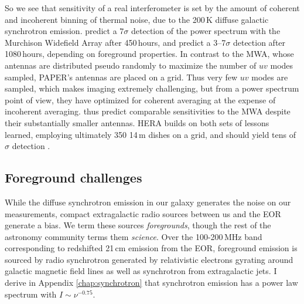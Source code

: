 {So we see that sensitivity of a real interferometer is set by the amount of coherent and incoherent binning of thermal noise, due to the 200\,K diffuse galactic synchrotron emission.  \citet{beardsley13} predict a $7\sigma$ detection of the power spectrum with the Murchison Widefield Array after 450\,hours, and \citet{PoberNextGen} predict a 3--7$\sigma$ detection after 1080\,hours, depending on foreground properties. In contrast to the MWA, whose antennas are distributed pseudo randomly to maximize the number of $uv$ modes sampled, PAPER's antennas are placed on a grid. Thus very few $uv$ modes are sampled, which makes imaging extremely challenging, but from a power spectrum point of view, they have optimized for coherent averaging at the expense of incoherent averaging. \citet{PoberNextGen} thus predict comparable sensitivities to the MWA despite their substantially smaller antennas. HERA builds on both sets of lessons learned, employing ultimately 350 14\,m dishes on a grid, and should yield tens of $\sigma$ detection \citep{neben16b,ewallwice16,nithya16,PoberNextGen,patra16}. 

\subsection{Foreground challenges}
\label{sec:foregroundchallenges}
While the diffuse synchrotron emission in our galaxy generates the noise on our measurements, compact extragalactic radio sources between us and the EOR generate a bias. We term  these sources \textit{foregrounds}, though the rest of the astronomy community terms them \textit{science}. Over the 100-200\,MHz band corresponding to redshifted 21\,cm emission from the EOR, foreground emission is sourced by radio synchrotron generated by relativistic electrons gyrating around galactic magnetic field lines as well as synchrotron from extragalactic jets. I derive in Appendix \ref{chap:synchrotron} that synchrotron emission has a power law spectrum with $I\sim\nu^{-0.75}$.

}
